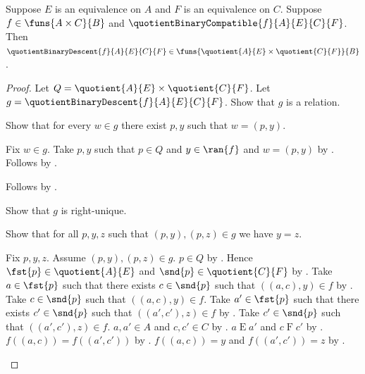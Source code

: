 \begin{theorem}\label{quotient_binary_descent_type}
    Suppose $E$ is an equivalence on $A$ and
        $F$ is an equivalence on $C$.
    Suppose $f\in\funs{A\times C}{B}$ and
        $\quotientBinaryCompatible{f}{A}{E}{C}{F}$.
    Then $\quotientBinaryDescent{f}{A}{E}{C}{F}\in
        \funs{
            \quotient{A}{E}\times\quotient{C}{F}}
            {B}$.
\end{theorem}
\begin{proof}
    Let $Q=\quotient{A}{E}\times\quotient{C}{F}$.
    Let $g=\quotientBinaryDescent{f}{A}{E}{C}{F}$.
    Show that $g$ is a relation.
    \begin{subproof}
        Show that for every $w\in g$ there exist $p,y$ such that
            $w=(p,y)$.
        \begin{subproof}
            Fix $w\in g$.
            Take $p,y$ such that $p\in Q$ and $y\in\ran{f}$ and
                $w=(p,y)$ by .
            Follows by \auto.
        \end{subproof}
        Follows by .
    \end{subproof}
    Show that $g$ is right-unique.
    \begin{subproof}
        Show that for all $p,y,z$ such that $(p,y),(p,z)\in g$
            we have $y=z$.
        \begin{subproof}
            Fix $p,y,z$.
            Assume $(p,y),(p,z)\in g$.
            $p\in Q$ by .
            Hence $\fst{p}\in\quotient{A}{E}$ and
                $\snd{p}\in\quotient{C}{F}$ by
                .
            Take $a\in\fst{p}$ such that there exists $c\in\snd{p}$
                such that $((a,c),y)\in f$ by
                .
            Take $c\in\snd{p}$ such that $((a,c),y)\in f$.
            Take $a'\in\fst{p}$ such that there exists $c'\in\snd{p}$
                such that $((a',c'),z)\in f$ by
                .
            Take $c'\in\snd{p}$ such that $((a',c'),z)\in f$.
            $a,a'\in A$ and $c,c'\in C$ by
                .
            $a\mathrel{E}a'$ and $c\mathrel{F}c'$ by
                .
            $f((a,c))=f((a',c'))$ by
                .
            $f((a,c))=y$ and $f((a',c'))=z$ by
                .
        \end{subproof}

\end{subproof}
\end{proof}
